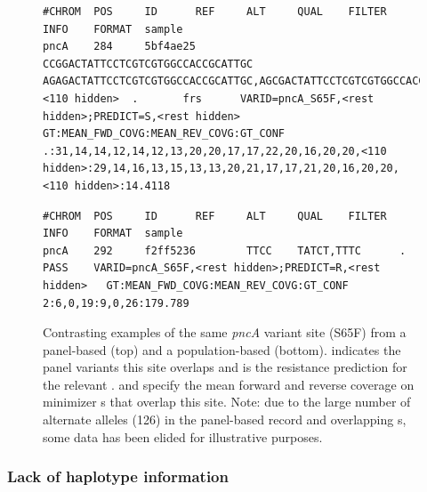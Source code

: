 \begin{figure}
\begin{Verbatim}[breaklines=true,breakanywhere=true,frame=single,framerule=0.5mm,fontsize=\footnotesize,label=\textit{pncA} mutation S65F VCF entry for panel-based \prg{}]
#CHROM  POS     ID      REF     ALT     QUAL    FILTER  INFO    FORMAT  sample
pncA    284     5bf4ae25        CCGGACTATTCCTCGTCGTGGCCACCGCATTGC       AGAGACTATTCCTCGTCGTGGCCACCGCATTGC,AGCGACTATTCCTCGTCGTGGCCACCGCATTGC,AGGGACTATTCCTCGTCGTGGCCACCGCATTGC,AGTGACTATTCCTCGTCGTGGCCACCGCATTGC,CAAGACTATTCCTCGTCGTGGCCACCGCATTGC,CAGGACTATTCCTCGTCGTGGCCACCGCATTGC,CCAGACTATTCCTCGTCGTGGCCACCGCATTGC,CCCGACTATTCCTCGTCGTGGCCACCGCATTGC,CCGCACTATTCCTCGTCGTGGCCACCGCATTGC,CCGCATTATTCCTCGTCGTGGCCACCGCATTGC,CCGGAATATTCCTCGTCGTGGCCACCGCATTGC,CCGGACTAATCCTCGTCGTGGCCACCGCATTGC,CCGGACTAGTCCTCGTCGTGGCCACCGCATTGC,CCGGACTATTCCCCATCGTGGCCACCGCATTGC,CCGGACTATTCCCCCTCGTGGCCACCGCATTGC,CCGGACTATTCCCCGTCGTGGCCACCGCATTGC,<110 hidden>  .       frs      VARID=pncA_S65F,<rest hidden>;PREDICT=S,<rest hidden>       GT:MEAN_FWD_COVG:MEAN_REV_COVG:GT_CONF      .:31,14,14,12,14,12,13,20,20,17,17,22,20,16,20,20,<110 hidden>:29,14,16,13,15,13,13,20,21,17,17,21,20,16,20,20,<110 hidden>:14.4118
\end{Verbatim}
\begin{Verbatim}[breaklines=true,breakanywhere=true,frame=single,framerule=0.5mm,fontsize=\footnotesize,label=\textit{pncA} mutation S65F VCF entry for population-based \prg{}]
#CHROM  POS     ID      REF     ALT     QUAL    FILTER  INFO    FORMAT  sample
pncA    292     f2ff5236        TTCC    TATCT,TTTC      .       PASS    VARID=pncA_S65F,<rest hidden>;PREDICT=R,<rest hidden>   GT:MEAN_FWD_COVG:MEAN_REV_COVG:GT_CONF     2:6,0,19:9,0,26:179.789
\end{Verbatim}
\caption{Contrasting examples of the same \textit{pncA} variant site (S65F) from a panel-based \prg{} (top) and a population-based \prg{} (bottom).  indicates the panel variants this site overlaps and  is the resistance prediction for the relevant .  and  specify the mean forward and reverse \kmer{} coverage on minimizer \kmer{}s that overlap this site. Note: due to the large number of alternate alleles (126) in the panel-based record and overlapping s, some data has been elided for illustrative purposes.}
\label{fig:example-pncA-dense}
\end{figure}

\subsubsection{Lack of haplotype information}

